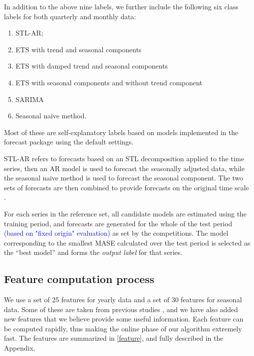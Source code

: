\documentclass[11pt,a4paper,]{article}
\providecommand{\tightlist}{%
  \setlength{\itemsep}{0pt}\setlength{\parskip}{0pt}}
\begin{document}
In addition to the above nine labels, we further include the following six class labels for both quarterly and monthly data:

\begin{enumerate}
\def\labelenumi{(\alph{enumi})}
\setcounter{enumi}{9}
\tightlist
\item
  STL-AR;
\item
  ETS with trend and seasonal components
\item
  ETS with damped trend and seasonal components
\item
  ETS with seasonal components and without trend component
\item
  SARIMA
\item
  Seasonal naive method.
\end{enumerate}

Most of these are self-explanatory labels based on models implemented in the forecast package using the default settings.

STL-AR refers to forecasts based on an STL decomposition applied to the time series, then an AR model is used to forecast the seasonally adjusted data, while the seasonal naive method is used to forecast the seasonal component. The two sets of forecasts are then combined to provide forecasts on the original time scale \autocite{hyndman2014forecasting}.

For each series in the reference set, all candidate models are estimated using the training period, and forecasts are generated for the whole of the test period \textcolor{blue}{(based on "fixed origin" evaluation)} as set by the competitions. The model corresponding to the smallest MASE \autocite{hyndman2006another} calculated over the test period is selected as the ``best model'' and forms the \emph{output label} for that series.

\hypertarget{sec:features}{%
\subsection{Feature computation process}\label{sec:features}}

We use a set of 25 features for yearly data and a set of 30 features for seasonal data. Some of these are taken from previous studies \autocites{wang2009rule}{hyndman2015large}{kang2017visualising}, and we have also added new features that we believe provide some useful information. Each feature can be computed rapidly, thus making the online phase of our algorithm extremely fast. The features are summarized in \autoref{feature}, and fully described in the Appendix.
\end{document}
